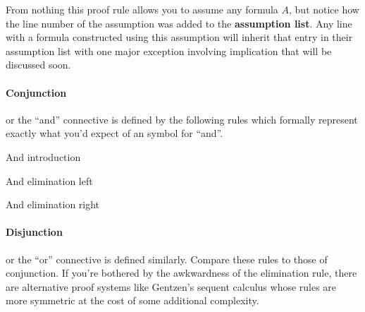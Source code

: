 From nothing this proof rule allows you to assume any formula $A$, but notice how the line number of the assumption was added to the {\bf assumption list}.
Any line with a formula constructed using this assumption will inherit that entry in their assumption list with one major exception involving implication that will be discussed soon.

\paragraph{Conjunction} or the ``and'' connective is defined by the following rules which formally represent exactly what you'd expect of an symbol for ``and''.

\begin{tcolorbox}[colback=purple!5!white,colframe=purple!75!black,title={\bf Conjunction Rules}]
	\centering
	\begin{lproof}{And introduction}
		\hline
	\end{lproof}
	
	\tcblower
	
	\begin{lproof}{And elimination left}
		\hline
	\end{lproof}
	\hfill
	\begin{lproof}{And elimination right}
		\hline
	\end{lproof}
\end{tcolorbox}

\paragraph{Disjunction} or the ``or'' connective is defined similarly.
Compare these rules to those of conjunction.
If you're bothered by the awkwardness of the elimination rule, there are alternative proof systems like Gentzen's sequent calculus whose rules are more symmetric at the cost of some additional complexity.

